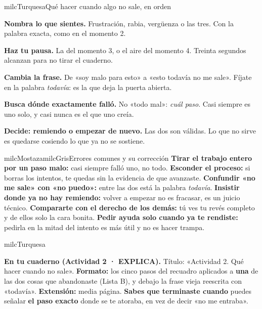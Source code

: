 \documentclass[11pt,letterpaper]{article}
\begin{document}
\begin{drawbox}{milcTurquesa}{Qué hacer cuando algo no sale, en orden}
\begin{pasoslista}
\item \textbf{Nombra lo que sientes.} Frustración, rabia, vergüenza o las tres. Con la palabra exacta, como en el momento 2.
\item \textbf{Haz tu pausa.} La del momento 3, o el aire del momento 4. Treinta segundos alcanzan para no tirar el cuaderno.
\item \textbf{Cambia la frase.} De «soy malo para esto» a «esto todavía no me sale». Fíjate en la palabra \emph{todavía}: es la que deja la puerta abierta.
\item \textbf{Busca dónde exactamente falló.} No «todo mal»: \emph{cuál paso}. Casi siempre es uno solo, y casi nunca es el que uno creía.
\item \textbf{Decide: remiendo o empezar de nuevo.} Las dos son válidas. Lo que no sirve es quedarse cosiendo lo que ya no se sostiene.
\end{pasoslista}
\end{drawbox}

\begin{softbox}{milcMostaza}{milcGris}{Errores comunes y su corrección}
\textbf{Tirar el trabajo entero por un paso malo:} casi siempre falló uno, no todo. \textbf{Esconder el proceso:} si borras los intentos, te quedas sin la evidencia de que avanzaste. \textbf{Confundir «no me sale» con «no puedo»:} entre las dos está la palabra \emph{todavía}. \textbf{Insistir donde ya no hay remiendo:} volver a empezar no es fracasar, es un juicio técnico. \textbf{Compararte con el derecho de los demás:} tú ves tu revés completo y de ellos solo la cara bonita. \textbf{Pedir ayuda solo cuando ya te rendiste:} pedirla en la mitad del intento es más útil y no es hacer trampa.
\end{softbox}

\begin{infoband}{milcTurquesa}


\textbf{En tu cuaderno (Actividad 2 · EXPLICA).} Título: «Actividad 2. Qué hacer cuando no sale». \textbf{Formato:} los cinco pasos del recuadro aplicados a \textbf{una} de las dos cosas que abandonaste (Lista B), y debajo la frase vieja reescrita con «todavía». \textbf{Extensión:} media página. \textbf{Sabes que terminaste cuando} puedes señalar \textbf{el paso exacto} donde se te atoraba, en vez de decir «no me entraba».
\end{infoband}
\end{document}
